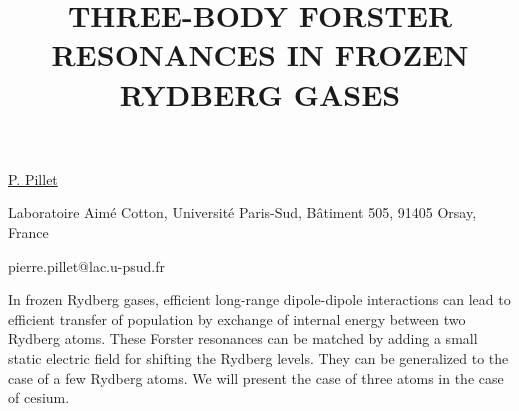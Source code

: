\title{THREE-BODY FORSTER RESONANCES IN FROZEN RYDBERG GASES}

\underline{P. Pillet} 

{\normalsize{\vspace{-4mm}
Laboratoire Aim\'e Cotton, Universit\'e Paris-Sud, B\^atiment 505, 91405 Orsay, France

\email pierre.pillet@lac.u-psud.fr}}

In frozen Rydberg gases, efficient long-range dipole-dipole interactions can lead to efficient transfer of population by exchange of
internal energy between two Rydberg atoms. These Forster resonances can be matched by adding a small static electric field for
shifting the Rydberg levels. They can be generalized to the case of a few Rydberg atoms. We will present the case of three atoms in
the case of cesium.

\vspace{\baselineskip}
